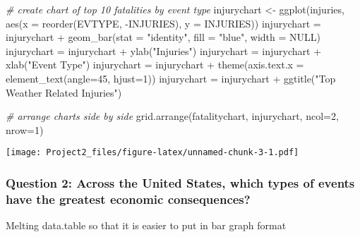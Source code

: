 \documentclass[
]{article}
\newenvironment{Shaded}{\begin{snugshade}}{\end{snugshade}}
\newcommand{\AttributeTok}[1]{\textcolor[rgb]{0.77,0.63,0.00}{#1}}
\newcommand{\CommentTok}[1]{\textcolor[rgb]{0.56,0.35,0.01}{\textit{#1}}}
\newcommand{\ConstantTok}[1]{\textcolor[rgb]{0.00,0.00,0.00}{#1}}
\newcommand{\DecValTok}[1]{\textcolor[rgb]{0.00,0.00,0.81}{#1}}
\newcommand{\FunctionTok}[1]{\textcolor[rgb]{0.00,0.00,0.00}{#1}}
\newcommand{\NormalTok}[1]{#1}
\newcommand{\OtherTok}[1]{\textcolor[rgb]{0.56,0.35,0.01}{#1}}
\newcommand{\SpecialCharTok}[1]{\textcolor[rgb]{0.00,0.00,0.00}{#1}}
\newcommand{\StringTok}[1]{\textcolor[rgb]{0.31,0.60,0.02}{#1}}
\begin{document}
\begin{Shaded}
\begin{Highlighting}[]
\CommentTok{\# create chart of top 10 fatalities by event type}
\NormalTok{injurychart }\OtherTok{\textless{}{-}} \FunctionTok{ggplot}\NormalTok{(injuries, }\FunctionTok{aes}\NormalTok{(}\AttributeTok{x =} \FunctionTok{reorder}\NormalTok{(EVTYPE, }\SpecialCharTok{{-}}\NormalTok{INJURIES), }\AttributeTok{y =}\NormalTok{ INJURIES)) }
\NormalTok{injurychart }\OtherTok{=}\NormalTok{ injurychart }\SpecialCharTok{+} \FunctionTok{geom\_bar}\NormalTok{(}\AttributeTok{stat =} \StringTok{"identity"}\NormalTok{, }\AttributeTok{fill =} \StringTok{"blue"}\NormalTok{, }\AttributeTok{width =} \ConstantTok{NULL}\NormalTok{)}
\NormalTok{injurychart }\OtherTok{=}\NormalTok{ injurychart }\SpecialCharTok{+} \FunctionTok{ylab}\NormalTok{(}\StringTok{"Injuries"}\NormalTok{) }
\NormalTok{injurychart }\OtherTok{=}\NormalTok{ injurychart }\SpecialCharTok{+} \FunctionTok{xlab}\NormalTok{(}\StringTok{"Event Type"}\NormalTok{) }
\NormalTok{injurychart }\OtherTok{=}\NormalTok{ injurychart }\SpecialCharTok{+} \FunctionTok{theme}\NormalTok{(}\AttributeTok{axis.text.x =} \FunctionTok{element\_text}\NormalTok{(}\AttributeTok{angle=}\DecValTok{45}\NormalTok{, }\AttributeTok{hjust=}\DecValTok{1}\NormalTok{))}
\NormalTok{injurychart }\OtherTok{=}\NormalTok{ injurychart }\SpecialCharTok{+} \FunctionTok{ggtitle}\NormalTok{(}\StringTok{"Top Weather Related Injuries"}\NormalTok{)}

\CommentTok{\# arrange charts side by side}
\FunctionTok{grid.arrange}\NormalTok{(fatalitychart, injurychart, }\AttributeTok{ncol=}\DecValTok{2}\NormalTok{, }\AttributeTok{nrow=}\DecValTok{1}\NormalTok{)}
\end{Highlighting}
\end{Shaded}

\texttt{[image: Project2\_files/figure-latex/unnamed-chunk-3-1.pdf]}

\hypertarget{question-2-across-the-united-states-which-types-of-events-have-the-greatest-economic-consequences}{%
\subsubsection{Question 2: Across the United States, which types of
events have the greatest economic
consequences?}\label{question-2-across-the-united-states-which-types-of-events-have-the-greatest-economic-consequences}}

Melting data.table so that it is easier to put in bar graph format
\end{document}

